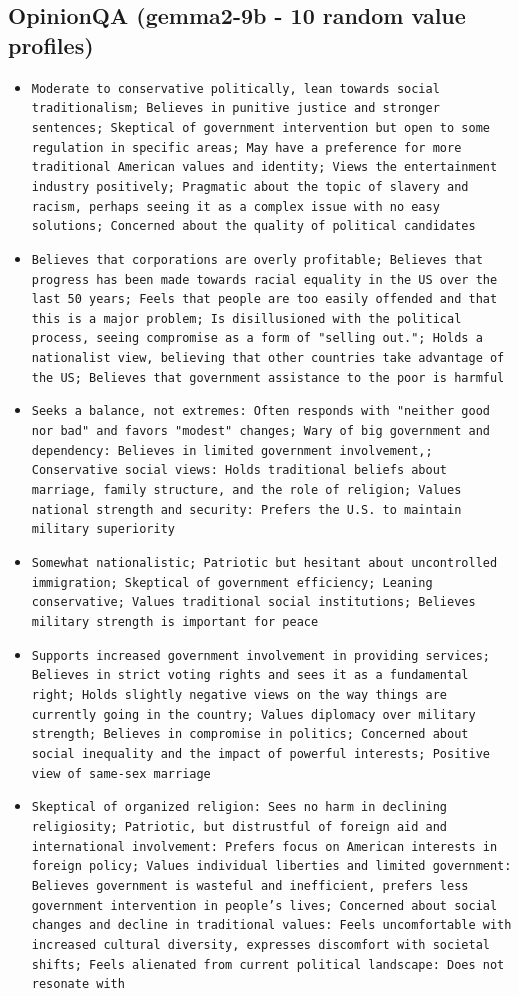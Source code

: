 \documentclass[11pt]{article}
\begin{document}
\subsection{OpinionQA (gemma2-9b - 10 random value profiles)}
\begin{itemize}
\item \texttt{Moderate to conservative politically, lean towards social traditionalism; Believes in punitive justice and stronger sentences; Skeptical of government intervention but open to some regulation in specific areas; May have a preference for more traditional American values and identity; Views the entertainment industry positively; Pragmatic about the topic of slavery and racism, perhaps seeing it as a complex issue with no easy solutions; Concerned about the quality of political candidates}
\item \texttt{Believes that corporations are overly profitable; Believes that progress has been made towards racial equality in the US over the last 50 years; Feels that people are too easily offended and that this is a major problem; Is disillusioned with the political process, seeing compromise as a form of "selling out."; Holds a nationalist view, believing that other countries take advantage of the US; Believes that government assistance to the poor is harmful}
\item \texttt{Seeks a balance, not extremes: Often responds with "neither good nor bad" and favors "modest" changes; Wary of big government and dependency: Believes in limited government involvement,; Conservative social views: Holds traditional beliefs about marriage, family structure, and the role of religion; Values national strength and security:  Prefers the U.S. to maintain military superiority}
\item \texttt{Somewhat nationalistic; Patriotic but hesitant about uncontrolled immigration; Skeptical of government efficiency; Leaning conservative; Values traditional social institutions; Believes military strength is important for peace}
\item \texttt{Supports increased government involvement in providing services; Believes in strict voting rights and sees it as a fundamental right; Holds slightly negative views on the way things are currently going in the country; Values diplomacy over military strength; Believes in compromise in politics; Concerned about social inequality and the impact of powerful interests; Positive view of same-sex marriage}
\item \texttt{Skeptical of organized religion: Sees no harm in declining religiosity; Patriotic, but distrustful of foreign aid and international involvement: Prefers focus on American interests in foreign policy; Values individual liberties and limited government: Believes government is wasteful and inefficient, prefers less government intervention in people's lives; Concerned about social changes and decline in traditional values: Feels uncomfortable with increased cultural diversity, expresses discomfort with societal shifts; Feels alienated from current political landscape: Does not resonate with}

\end{itemize}
\end{document}

